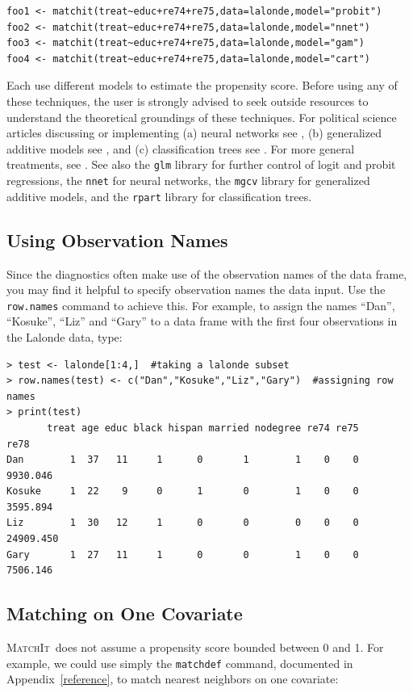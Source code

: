 \documentclass[oneside,letterpaper,titlepage]{article}
\newcommand{\MatchIt}{\textsc{MatchIt}}
\begin{document}
\begin{verbatim}
foo1 <- matchit(treat~educ+re74+re75,data=lalonde,model="probit")
foo2 <- matchit(treat~educ+re74+re75,data=lalonde,model="nnet")
foo3 <- matchit(treat~educ+re74+re75,data=lalonde,model="gam")
foo4 <- matchit(treat~educ+re74+re75,data=lalonde,model="cart")
\end{verbatim}

Each use different models to estimate the propensity score.  Before
using any of these techniques, the user is strongly advised to seek
outside resources to understand the theoretical groundings of these
techniques.  For political science articles discussing or implementing
(a) neural networks see \citet{beck99,Zeng99,Zeng00,LagRus02}, (b)
generalized additive models see \citet{BecJac98}, and (c)
classification trees see \citet{RugKimMar03}.  For more general
treatments, see \citet{Bishop95,White92,BreFriOls84}.  See also the
\texttt{glm} library for further control of logit and probit
regressions, the \texttt{nnet} for neural networks, the \texttt{mgcv}
library for generalized additive models, and the \texttt{rpart}
library for classification trees.

\subsection{Using Observation Names}
\label{rnames}

Since the diagnostics often make use of the observation names of the
data frame, you may find it helpful to specify observation names the
data input.  Use the \texttt{row.names} command to achieve this.  For
example, to assign the names ``Dan'', ``Kosuke'', ``Liz'' and ``Gary''
to a data frame with the first four observations in the Lalonde data,
type:

\begin{verbatim}
> test <- lalonde[1:4,]  #taking a lalonde subset
> row.names(test) <- c("Dan","Kosuke","Liz","Gary")  #assigning row names
> print(test)
       treat age educ black hispan married nodegree re74 re75      re78
Dan        1  37   11     1      0       1        1    0    0  9930.046
Kosuke     1  22    9     0      1       0        1    0    0  3595.894
Liz        1  30   12     1      0       0        0    0    0 24909.450
Gary       1  27   11     1      0       0        1    0    0  7506.146
\end{verbatim} 

\subsection{Matching on One Covariate}
\MatchIt\ does not assume a propensity score bounded between 0 and 1.
For example, we could use simply the \texttt{matchdef} command,
documented in Appendix~\ref{reference}, to match nearest neighbors on
one covariate:
\end{document}
